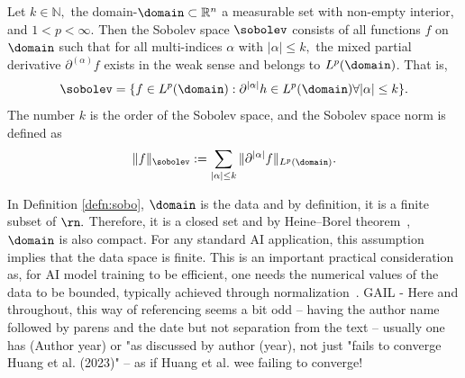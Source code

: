 \begin{definition}\label{defn:sobo}
    Let $k \in \mathbb{N},$ the domain-$\domain \subset \mathbb{R}^n$ a measurable set with non-empty interior, and $1< p < \infty.$ Then the Sobolev space $\sobolev$ consists of all functions $f$ on $\domain$ such that for all multi-indices $\alpha$ with $|\alpha| \leq k,$ the mixed partial derivative $\partial^{(\alpha)} f$ exists in the weak sense and belongs to $L^p(\domain)$. That is, 
    \[ \sobolev  = \{ f \in L^p(\domain) : \partial^{|\alpha|} h \in L^{p}(\domain) \forall |\alpha| \leq k \}.\]
    The number $k$ is the order of the Sobolev space, and the Sobolev space norm is defined as 
    \[ \|f\|_{\sobolev} := \sum_{ |\alpha| \leq k } \| \partial^{|\alpha|} f \|_{L^{p}(\domain)}.\]
\end{definition}
In Definition \ref{defn:sobo}, $\domain$ is the data and  by definition, it is a finite subset of $\rn.$ Therefore, it is a closed set and by Heine--Borel theorem~\cite{rudin1976principles}, $\domain$ is also compact. For any standard AI application, this assumption implies that the data space is finite. This is an important practical consideration as, for AI model training to be efficient, one needs the numerical values of the data to be bounded, typically achieved through normalization~\cite{huang2023normalization}. 
GAIL - Here and throughout, this way of referencing seems a bit odd -- having the author name followed by parens and the date but not separation from the text -- usually one has (Author year) or "as discussed by author (year), not just "fails to converge Huang et al. (2023)" -- as if Huang et al. wee failing to converge!

